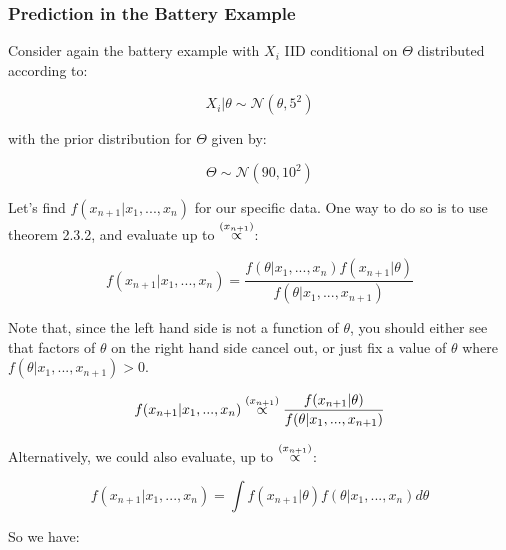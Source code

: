 \documentclass[a4paper]{article}
\begin{document}
            \subsubsection{Prediction in the Battery Example}
                Consider again the battery example with $X_i$ IID conditional on
                $\Theta$ distributed according to:

                \[
                    X_i | \theta \sim \mathcal{N}(\theta, 5^2)
                \]

                with the prior distribution for $\Theta$ given by:

                \[
                    \Theta \sim \mathcal{N}(90, 10^2)
                \]

                Let's find $f(x_{n+1} | x_1, ..., x_n)$ for our specific data.
                One way to do so is to use theorem 2.3.2, and evaluate up to
                $\stackrel{({x_{n+1}})}{\propto}$:

                \[
                    f(x_{n+1} | x_1, ..., x_n) = \frac{f(\theta | x_1, ..., x_n)
                    f(x_{n+1} | \theta)}{f(\theta | x_1, ..., x_{n+1})}
                \]

                Note that, since the left hand side is not a function of
                $\theta$, you should either see that factors of $\theta$ on the
                right hand side cancel out, or just fix a value of $\theta$
                where $f(\theta | x_1, ..., x_{n + 1}) > 0$.

                \[
                    f(x_{n+1} | x_1, ..., x_n) \stackrel{({x_{n+1}})}{\propto}
                        \frac{f(x_{n+1} | \theta)}{f(\theta |x_1, ..., x_{n+1})}
                \]

                Alternatively, we could also evaluate, up to
                $\stackrel{({x_{n+1}})}{\propto}$:

                $$
                    f(x_{n+1}|x_1, ..., x_n) = \int f(x_{n+1}|\theta)f(\theta|
                    x_1, ..., x_n) d\theta
                $$

                So we have:
\end{document}
